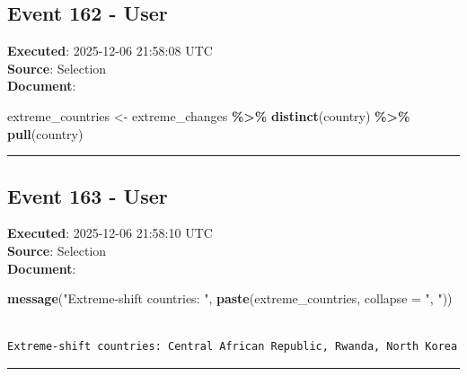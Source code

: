 \documentclass[
  11pt,
]{article}
\newenvironment{Shaded}{\begin{snugshade}}{\end{snugshade}}
\newcommand{\AttributeTok}[1]{\textcolor[rgb]{0.13,0.29,0.53}{#1}}
\newcommand{\FunctionTok}[1]{\textcolor[rgb]{0.13,0.29,0.53}{\textbf{#1}}}
\newcommand{\NormalTok}[1]{#1}
\newcommand{\OtherTok}[1]{\textcolor[rgb]{0.56,0.35,0.01}{#1}}
\newcommand{\SpecialCharTok}[1]{\textcolor[rgb]{0.81,0.36,0.00}{\textbf{#1}}}
\newcommand{\StringTok}[1]{\textcolor[rgb]{0.31,0.60,0.02}{#1}}
\newenvironment{rpoutput}{\vspace{0.5em}\begin{snugshade}}{\end{snugshade}}
\begin{document}
\subsection{Event 162 - User}\label{event-162---user}

\textbf{Executed}: 2025-12-06 21:58:08 UTC\\
\textbf{Source}: Selection\\
\textbf{Document}:

\begin{Shaded}
\begin{Highlighting}[]
\NormalTok{extreme\_countries }\OtherTok{\textless{}{-}}\NormalTok{ extreme\_changes }\SpecialCharTok{\%\textgreater{}\%}
  \FunctionTok{distinct}\NormalTok{(country) }\SpecialCharTok{\%\textgreater{}\%}
  \FunctionTok{pull}\NormalTok{(country)}
\end{Highlighting}
\end{Shaded}

\begin{center}\rule{0.5\linewidth}{0.5pt}\end{center}

\subsection{Event 163 - User}\label{event-163---user}

\textbf{Executed}: 2025-12-06 21:58:10 UTC\\
\textbf{Source}: Selection\\
\textbf{Document}:

\begin{Shaded}
\begin{Highlighting}[]
\FunctionTok{message}\NormalTok{(}\StringTok{"Extreme{-}shift countries: "}\NormalTok{, }\FunctionTok{paste}\NormalTok{(extreme\_countries, }\AttributeTok{collapse =} \StringTok{", "}\NormalTok{))}
\end{Highlighting}
\end{Shaded}

\begin{rpoutput}

\begin{verbatim}

Extreme-shift countries: Central African Republic, Rwanda, North Korea
\end{verbatim}

\end{rpoutput}

\begin{center}\rule{0.5\linewidth}{0.5pt}\end{center}
\end{document}
